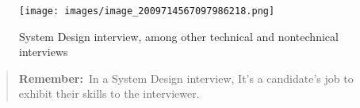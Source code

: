 \begin{figure}[htbp]
    \centering
    \texttt{[image: images/image\_2009714567097986218.png]}
    \caption{System Design interview, among other technical and nontechnical interviews}
\end{figure}

\begin{quote} \textbf{Remember:}~In a System Design interview, It's a candidate's job to exhibit their skills to the interviewer. \end{quote}

